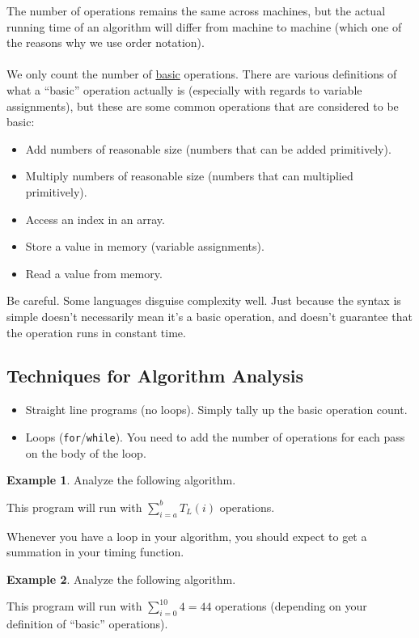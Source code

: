 \documentclass[]{article}
\theoremstyle{definition}
\newtheorem{ex}{Example}[section]
\begin{document}
		The number of operations remains the same across machines, but the actual running time of an algorithm will differ from machine to machine (which one of the reasons why we use order notation).
		\\ \\
		We only count the number of \underline{basic} operations. There are various definitions of what a ``basic'' operation actually is (especially with regards to variable assignments), but these are some common operations that are considered to be basic:
		\begin{itemize}
			\item Add numbers of reasonable size (numbers that can be added primitively).
			\item Multiply numbers of reasonable size (numbers that can multiplied primitively).
			\item Access an index in an array.
			\item Store a value in memory (variable assignments).
			\item Read a value from memory.
		\end{itemize}
		Be careful. Some languages disguise complexity well. Just because the syntax is simple doesn't necessarily mean it's a basic operation, and doesn't guarantee that the operation runs in constant time.

		\subsection{Techniques for Algorithm Analysis}
			\begin{itemize}
				\item Straight line programs (no loops). Simply tally up the basic operation count.
				\item Loops (\verb+for+/\verb+while+). You need to add the number of operations for each pass on the body of the loop.
			\end{itemize}

			\begin{ex}
				Analyze the following algorithm. \\
				\begin{algorithm}[H]
				\end{algorithm}
				This program will run with $\sum_{i = a}^{b} T_L(i)$ operations.
			\end{ex}

			Whenever you have a loop in your algorithm, you should expect to get a summation in your timing function.
			\begin{ex}
				Analyze the following algorithm. \\
				\begin{algorithm}[H]
				\end{algorithm}

				This program will run with $\sum_{i = 0}^{10} 4 = 44$ operations (depending on your definition of ``basic'' operations).
			\end{ex}
\end{document}

